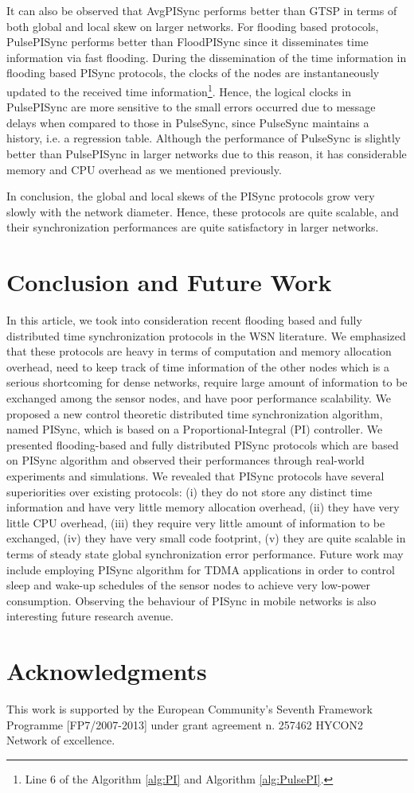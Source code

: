 \documentclass[english,a4paper,10pt,final]{article}
\numberwithin{equation}{section}
\numberwithin{figure}{section}
\begin{document}
It can also be observed that AvgPISync performs better than GTSP in terms of both global and local skew on larger networks. For flooding based protocols, PulsePISync performs better than FloodPISync since it disseminates time information via fast flooding. During the dissemination of the time information in flooding based PISync protocols, the clocks of the nodes are instantaneously updated to the received time information\footnote{Line 6 of the Algorithm \ref{alg:PI} and Algorithm \ref{alg:PulsePI}.}. Hence, the logical clocks in PulsePISync are more sensitive to the small errors occurred due to message delays when compared to those in PulseSync, since PulseSync maintains a history, i.e. a regression table. Although the performance of PulseSync is slightly better than PulsePISync in larger networks due to this reason, it has considerable memory and CPU overhead as we mentioned previously.

In conclusion, the global and local skews of the PISync protocols grow very slowly with the network diameter. Hence, these protocols are quite scalable, and their synchronization performances are quite satisfactory in larger networks. 

\section{Conclusion and Future Work}

\label{sec:Conclusion-and-Future}

In this article, we took into consideration recent flooding based and fully distributed time synchronization protocols in the WSN literature. We emphasized that these protocols are heavy in terms of computation and memory allocation overhead, need to keep track of time information of the other nodes which is a serious shortcoming for dense networks, require large amount of information to be exchanged among the sensor nodes, and have poor performance scalability. We proposed a new control theoretic distributed time synchronization algorithm, named PISync, which is based on a Proportional-Integral (PI) controller. We presented flooding-based and fully distributed PISync protocols which are based on PISync algorithm and observed their performances through real-world experiments and simulations. We revealed that PISync protocols have several superiorities over existing protocols: (i) they do not store any distinct time information and have very little memory allocation overhead, (ii) they have very little CPU overhead, (iii) they require very little amount of information to be exchanged, (iv) they have very small code footprint, (v) they are  quite scalable in terms of steady state global synchronization error performance. Future work may include employing PISync algorithm for TDMA applications in order to control sleep and wake-up schedules of the sensor nodes to achieve very low-power consumption. Observing the behaviour of PISync in mobile networks is also interesting future research avenue.

\section*{{\large Acknowledgments}}
This work is supported by the European Community's Seventh Framework Programme [FP7/2007-2013] under grant agreement n. 257462 HYCON2 Network of excellence.


\end{document}
